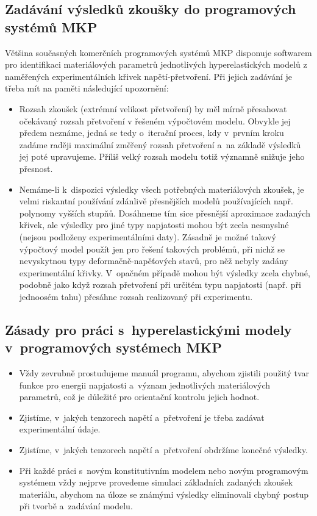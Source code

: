 \subsection{Zadávání výsledků zkoušky do programových systémů MKP}
Většina současných komerčních programových systémů MKP disponuje softwarem pro identifikaci materiálových parametrů jednotlivých hyperelastických modelů z naměřených experimentálních křivek napětí-přetvoření. Při jejich zadávání je třeba mít na paměti následující upozornění:
\begin{itemize}
	\item Rozsah zkoušek (extrémní velikost přetvoření) by měl mírně přesahovat očekávaný rozsah přetvoření v řešeném výpočtovém modelu. Obvykle jej předem neznáme, jedná se tedy o~iterační proces, kdy v~prvním kroku zadáme raději maximální změřený rozsah přetvoření a~na základě výsledků jej poté upravujeme. Příliš velký rozsah modelu totiž významně snižuje jeho přesnost.
	\item Nemáme-li k~dispozici výsledky všech potřebných materiálových zkoušek, je velmi riskantní používání zdánlivě přesnějších modelů používajících např. polynomy vyšších stupňů. Dosáhneme tím sice přesnější aproximace zadaných křivek, ale výsledky pro jiné typy napjatosti mohou být zcela nesmyslné (nejsou podloženy experimentálními daty). Zásadně je možné takový výpočtový model použít jen pro řešení takových problémů, při nichž se nevyskytnou typy deformačně-napěťových stavů, pro něž nebyly zadány experimentální křivky. V~opačném případě mohou být výsledky zcela chybné, podobně jako když rozsah přetvoření při určitém typu napjatosti (např. při jednoosém tahu) přesáhne rozsah realizovaný při experimentu.
\end{itemize}

\subsection{Zásady pro práci s~hyperelastickými modely v~programových systémech MKP}
\begin{itemize}
	\item Vždy zevrubně prostudujeme manuál programu, abychom zjistili použitý tvar funkce pro energii napjatosti a~význam jednotlivých materiálových parametrů, což je důležité pro orientační kontrolu jejich hodnot.
	\item Zjistíme, v~jakých tenzorech napětí a~přetvoření je třeba zadávat experimentální údaje.
	\item Zjistíme, v~jakých tenzorech napětí a~přetvoření obdržíme konečné výsledky. 
	\item Při každé práci s~novým konstitutivním modelem nebo novým programovým systémem vždy nejprve provedeme simulaci základních zadaných zkoušek materiálu, abychom na úloze se známými výsledky eliminovali chybný postup při tvorbě a~zadávání modelu.
\end{itemize}
